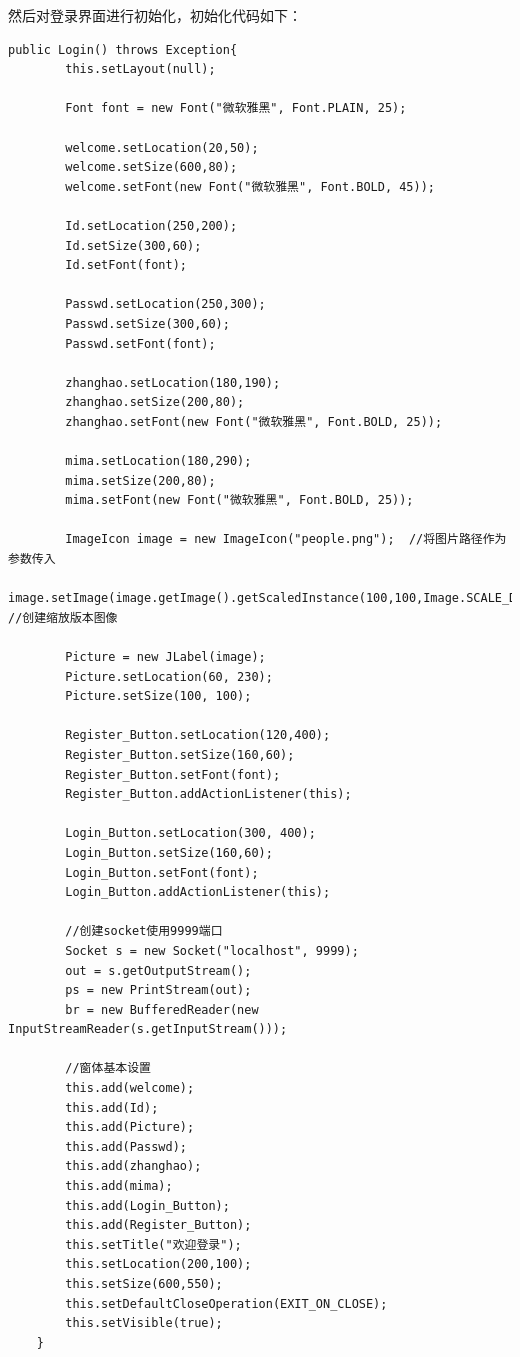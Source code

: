 \documentclass[UTF8,12pt]{article}
\begin{document}
然后对登录界面进行初始化，初始化代码如下：
\begin{lstlisting}[title=登录界面的初始化,frame=shadowbox]
    public Login() throws Exception{
        this.setLayout(null);

        Font font = new Font("微软雅黑", Font.PLAIN, 25);

        welcome.setLocation(20,50);
        welcome.setSize(600,80);
        welcome.setFont(new Font("微软雅黑", Font.BOLD, 45));

        Id.setLocation(250,200);
        Id.setSize(300,60);
        Id.setFont(font);

        Passwd.setLocation(250,300);
        Passwd.setSize(300,60);
        Passwd.setFont(font);

        zhanghao.setLocation(180,190);
        zhanghao.setSize(200,80);
        zhanghao.setFont(new Font("微软雅黑", Font.BOLD, 25));

        mima.setLocation(180,290);
        mima.setSize(200,80);
        mima.setFont(new Font("微软雅黑", Font.BOLD, 25));

        ImageIcon image = new ImageIcon("people.png");  //将图片路径作为参数传入
        image.setImage(image.getImage().getScaledInstance(100,100,Image.SCALE_DEFAULT));  //创建缩放版本图像

        Picture = new JLabel(image);
        Picture.setLocation(60, 230);
        Picture.setSize(100, 100);

        Register_Button.setLocation(120,400);
        Register_Button.setSize(160,60);
        Register_Button.setFont(font);
        Register_Button.addActionListener(this);

        Login_Button.setLocation(300, 400);
        Login_Button.setSize(160,60);
        Login_Button.setFont(font);
        Login_Button.addActionListener(this);

        //创建socket使用9999端口
        Socket s = new Socket("localhost", 9999);
        out = s.getOutputStream();
        ps = new PrintStream(out);
        br = new BufferedReader(new InputStreamReader(s.getInputStream()));

        //窗体基本设置
        this.add(welcome);
        this.add(Id);
        this.add(Picture);
        this.add(Passwd);
        this.add(zhanghao);
        this.add(mima);
        this.add(Login_Button);
        this.add(Register_Button);
        this.setTitle("欢迎登录");
        this.setLocation(200,100);
        this.setSize(600,550);
        this.setDefaultCloseOperation(EXIT_ON_CLOSE);
        this.setVisible(true);
    }
\end{lstlisting}
\end{document}
